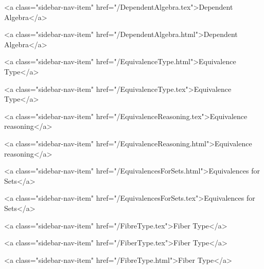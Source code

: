       
        
          <a class="sidebar-nav-item" href="/DependentAlgebra.tex">Dependent Algebra</a>
        
      
    
      
        
          <a class="sidebar-nav-item" href="/DependentAlgebra.html">Dependent Algebra</a>
        
      
    
      
        
          <a class="sidebar-nav-item" href="/EquivalenceType.html">Equivalence Type</a>
        
      
    
      
        
          <a class="sidebar-nav-item" href="/EquivalenceType.tex">Equivalence Type</a>
        
      
    
      
        
          <a class="sidebar-nav-item" href="/EquivalenceReasoning.tex">Equivalence reasoning</a>
        
      
    
      
        
          <a class="sidebar-nav-item" href="/EquivalenceReasoning.html">Equivalence reasoning</a>
        
      
    
      
        
          <a class="sidebar-nav-item" href="/EquivalencesForSets.html">Equivalences for Sets</a>
        
      
    
      
        
          <a class="sidebar-nav-item" href="/EquivalencesForSets.tex">Equivalences for Sets</a>
        
      
    
      
        
          <a class="sidebar-nav-item" href="/FibreType.tex">Fiber Type</a>
        
      
    
      
        
          <a class="sidebar-nav-item" href="/FiberType.tex">Fiber Type</a>
        
      
    
      
        
          <a class="sidebar-nav-item" href="/FibreType.html">Fiber Type</a>
        
